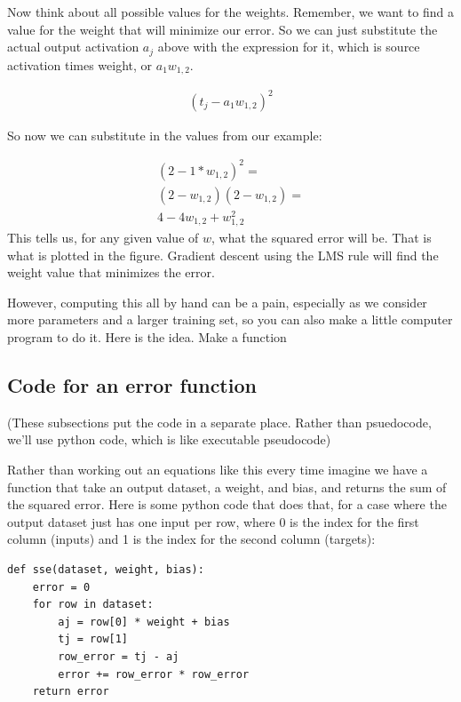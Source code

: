 Now think about all possible values for the weights. Remember, we want to find a value for the weight that will minimize our error. So we can just substitute the actual output activation $a_j$ above with the expression for it, which is source activation times weight, or  $a_1 w_{1,2}$.

\begin{eqnarray*}
(t_j - a_1 w_{1,2})^2
\end{eqnarray*}

So now we can substitute in the values from our example:

\begin{eqnarray*}
(2 - 1 * w_{1,2})^2 = \\
(2 - w_{1,2}) (2 - w_{1,2} ) =  \\
4-4w_{1,2}+w_{1,2}^2
\end{eqnarray*}
This tells us, for any given value of $w$, what the squared error will be. That is what is plotted in the figure. Gradient descent using the LMS rule will find the weight value that minimizes the error.

However, computing this all by hand can be  a pain, especially as we consider more parameters and a larger training set, so you can also make a little computer program to do it.  Here is the idea. Make a function

\subsection{Code for an error function}

(These subsections put the code in a separate place. Rather than psuedocode, we'll use python code, which is like executable pseudocode)

Rather than working out an equations like this every time imagine we have a function that take an output dataset, a weight, and bias, and returns the sum of the squared error. Here is some python code that does that, for a case where the output dataset just has one input per row, where 0 is the index for the first column (inputs) and 1 is the index for the second column (targets):

\begin{center}
\begin{minipage}{0.5\textwidth}
\begin{verbatim}
def sse(dataset, weight, bias):
    error = 0
    for row in dataset:
        aj = row[0] * weight + bias
        tj = row[1]
        row_error = tj - aj
        error += row_error * row_error
    return error
\end{verbatim}
\end{minipage}
\end{center}

